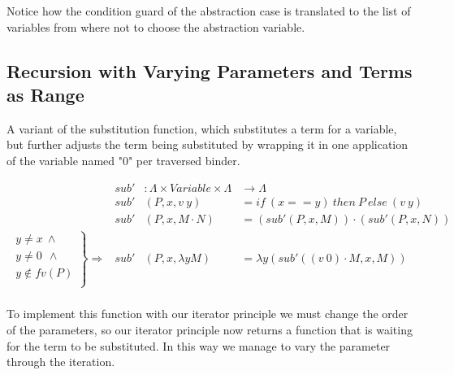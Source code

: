 \documentclass{entcs}
\begin{document}
Notice how the condition guard of the abstraction case is translated to the list of variables from where not to choose the abstraction variable.

 \hspace{5px}

\subsection{Recursion with Varying Parameters and Terms as Range}

A variant of the substitution function, which substitutes a term for a variable, but further adjusts the term being substituted by wrapping it in one application of the variable named "0" per traversed binder.

\[
\begin{array}{rrll}
&sub' &: \Lambda \times Variable \times  \Lambda &   \rightarrow  \Lambda  \\
&sub' &(P , x , v\ y)         &= if\ (x == y)\ then\ P\ else\ (v\ y)   \\
&sub' &(P , x , M \cdot N)    &= (sub' (P , x , M)) \cdot (sub' (P , x , N)) \\
\left. 
\begin{array}{c}
y \neq x  \ \wedge \\
 y \neq 0\ \  \wedge \\
 y \not\in fv(P) \\
\end{array} \right\} \Rightarrow&sub' &(P , x , \lambda y M)   &= \lambda y (sub' ((v\ 0) \cdot M , x , M)) \\
\end{array} \]

To implement this function with our iterator principle we must change the order of the parameters, so our iterator principle now returns a function that is waiting for the term to be substituted. In this way we manage to vary the parameter through the iteration.

 \hspace{5px}

%
\end{document}
